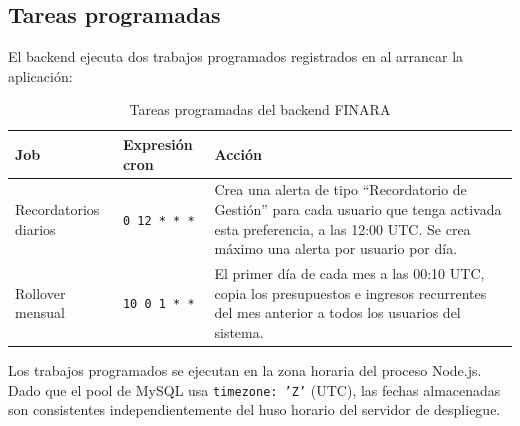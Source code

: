 \subsection{Tareas programadas}

El backend ejecuta dos trabajos programados registrados en
 al arrancar la aplicación:

\begin{table}[H]
  \centering
  \caption{Tareas programadas del backend FINARA}
  \label{tab:cron-jobs}
  \begin{tabular}{p{4.5cm} p{2.8cm} p{6.2cm}}
    \toprule
    \textbf{Job} & \textbf{Expresión cron} & \textbf{Acción} \\
    \midrule
    Recordatorios diarios & \texttt{0 12 * * *} & Crea una alerta de tipo
      ``Recordatorio de Gestión'' para cada usuario que tenga activada
      esta preferencia, a las 12:00 UTC. Se crea máximo una alerta por
      usuario por día. \\[6pt]
    Rollover mensual & \texttt{10 0 1 * *} & El primer día de cada mes a
      las 00:10 UTC, copia los presupuestos e ingresos recurrentes del
      mes anterior a todos los usuarios del sistema. \\
    \bottomrule
  \end{tabular}
\end{table}

\begin{infobox}
  Los trabajos programados se ejecutan en la zona horaria del proceso
  Node.js. Dado que el pool de MySQL usa \texttt{timezone: 'Z'} (UTC),
  las fechas almacenadas son consistentes independientemente del
  huso horario del servidor de despliegue.
\end{infobox}
